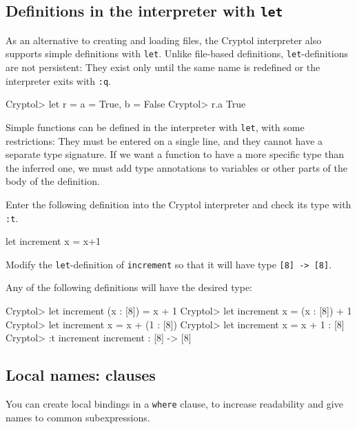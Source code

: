 \subsection{Definitions in the interpreter with \texttt{let}}
\label{sec:interpreter-let}
As an alternative to creating and loading files, the Cryptol
interpreter also supports simple definitions with \texttt{let}. Unlike
file-based definitions, \texttt{let}-definitions are not persistent:
They exist only until the same name is redefined or the interpreter
exits with \texttt{:q}.
\restartrepl
\begin{replPrompt}
  Cryptol> let r = {a = True, b = False}
  Cryptol> r.a
  True
\end{replPrompt}
Simple functions can be defined in the interpreter with \texttt{let},
with some restrictions: They must be entered on a single line, and
they cannot have a separate type signature. If we want a function to
have a more specific type than the inferred one, we must add type
annotations to variables or other parts of the body of the definition.
\begin{Exercise}\label{ex:fn:0b}
  Enter the following definition into the Cryptol interpreter and check
  its type with \texttt{:t}.
\restartrepl
\begin{replinVerb}
  let increment x = x+1
\end{replinVerb}
Modify the \texttt{let}-definition of \texttt{increment} so that it
will have type \texttt{[8] -> [8]}.
\end{Exercise}
\begin{Answer}
Any of the following definitions will have the desired type:
\restartrepl
\begin{replPrompt}
  Cryptol> let increment (x : [8]) = x + 1
  Cryptol> let increment x = (x : [8]) + 1
  Cryptol> let increment x = x + (1 : [8])
  Cryptol> let increment x = x + 1 : [8]
  Cryptol> :t increment
  increment : [8] -> [8]
\end{replPrompt}
\end{Answer}

\subsection{Local names: {} clauses}
\label{sec:local-names:-ttfam}

You can create local bindings in a {\tt where} clause\indWhere, to
increase readability and give names to common subexpressions.

